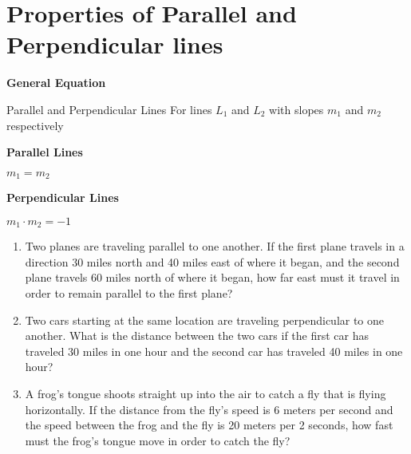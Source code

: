 \section[Linear Relationships]{Properties of Parallel and Perpendicular lines}

\textbf{General Equation}

\bigskip
\begin{equationbox}{Parallel and Perpendicular Lines}
\setlength{\columnseprule}{0pt}
For lines $L_1$ and $L_2$ with slopes $m_1$ and $m_2$ respectively

\begin{center}
\begin{multicols}{2}
\textbf{Parallel Lines}

$m_1=m_2$

\columnbreak
\textbf{Perpendicular Lines}

$m_1\cdot m_2=-1$
\end{multicols}
\end{center}
\end{equationbox}

\bigskip
\begin{enumerate}[labelindent=*,style=multiline,leftmargin=*,label=\textbf{Example \arabic*:}]
\item Two planes are traveling parallel to one another. If the first plane travels in a direction 30 miles north and 40 miles east of where it began, and the second plane travels 60 miles north of where it began, how far east must it travel in order to remain parallel to the first plane?

\vfill\item Two cars starting at the same location are traveling perpendicular to one another. What is the distance between the two cars if the first car has traveled 30 miles in one hour and the second car has traveled 40 miles in one hour?

\vfill\item A frog's tongue shoots straight up into the air to catch a fly that is flying horizontally. If the distance from the fly's speed is 6 meters per second and the speed between the frog and the fly is 20 meters per 2 seconds, how fast must the frog's tongue move in order to catch the fly?
\end{enumerate}

